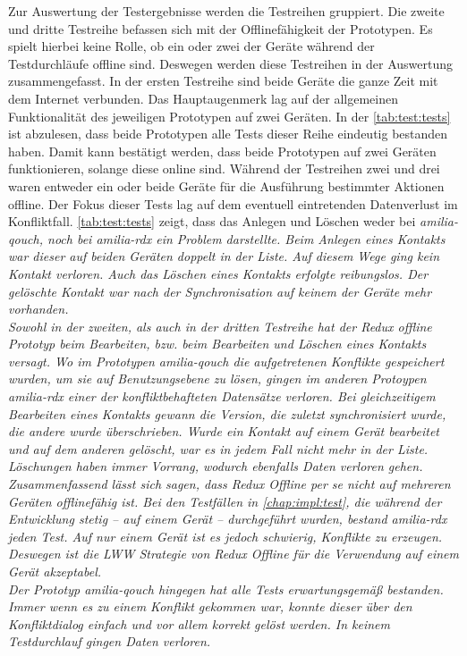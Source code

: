 Zur Auswertung der Testergebnisse werden die Testreihen gruppiert.
Die zweite und dritte Testreihe befassen sich mit der Offlinefähigkeit der Prototypen.
Es spielt hierbei keine Rolle, ob ein oder zwei der Geräte während der Testdurchläufe offline sind. Deswegen werden diese Testreihen in der Auswertung zusammengefasst.
%
%
%
In der ersten Testreihe sind beide Geräte die ganze Zeit mit dem Internet verbunden.
Das Hauptaugenmerk lag auf der allgemeinen Funktionalität des jeweiligen Prototypen auf zwei Geräten.
In der \autoref{tab:test:tests} ist abzulesen, dass beide Prototypen alle Tests dieser Reihe eindeutig bestanden haben.
Damit kann bestätigt werden, dass beide Prototypen auf zwei Geräten funktionieren, solange diese online sind.
%
%
%
Während der Testreihen zwei und drei waren entweder ein oder beide Geräte für die Ausführung bestimmter Aktionen offline.
Der Fokus dieser Tests lag auf dem eventuell eintretenden Datenverlust im Konfliktfall.
\autoref{tab:test:tests} zeigt, dass das Anlegen und Löschen weder bei \it{amilia-qouch}, noch bei \it{amilia-rdx} ein Problem darstellte.
Beim Anlegen eines Kontakts war dieser auf beiden Geräten doppelt in der Liste. Auf diesem Wege ging kein Kontakt verloren.
Auch das Löschen eines Kontakts erfolgte reibungslos. Der gelöschte Kontakt war nach der Synchronisation auf keinem der Geräte mehr vorhanden.\\
Sowohl in der zweiten, als auch in der dritten Testreihe hat der Redux offline Prototyp beim Bearbeiten, bzw. beim Bearbeiten und Löschen eines Kontakts versagt.
Wo im Prototypen \it{amilia-qouch} die aufgetretenen Konflikte gespeichert wurden, um sie auf Benutzungsebene zu lösen, gingen im anderen Protoypen \it{amilia-rdx} einer der konfliktbehafteten Datensätze verloren.
Bei gleichzeitigem Bearbeiten eines Kontakts gewann die Version, die zuletzt synchronisiert wurde, die andere wurde überschrieben.
Wurde ein Kontakt auf einem Gerät bearbeitet und auf dem anderen gelöscht, war es in jedem Fall nicht mehr in der Liste. Löschungen haben immer Vorrang, wodurch ebenfalls Daten verloren gehen.
% 
%
Zusammenfassend lässt sich sagen, dass Redux Offline per se nicht auf mehreren Geräten offlinefähig ist.
Bei den Testfällen in \autoref{chap:impl:test}, die während der Entwicklung stetig -- auf einem Gerät -- durchgeführt wurden, bestand \it{amilia-rdx} jeden Test.
Auf nur einem Gerät ist es jedoch schwierig, Konflikte zu erzeugen. Deswegen ist die \gls{LWW} Strategie von Redux Offline für die Verwendung auf einem Gerät akzeptabel.\\
Der Prototyp \it{amilia-qouch} hingegen hat alle Tests erwartungsgemäß bestanden.
Immer wenn es zu einem Konflikt gekommen war, konnte dieser über den Konfliktdialog einfach und vor allem korrekt gelöst werden.
In keinem Testdurchlauf gingen Daten verloren.
%